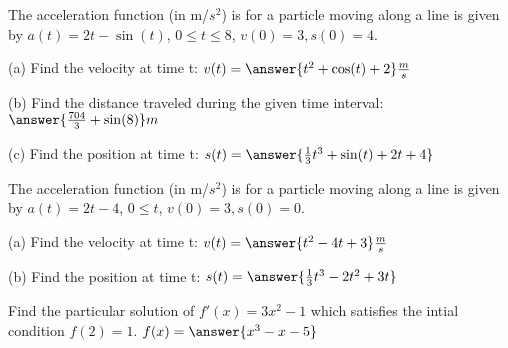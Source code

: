 \documentclass{ximera}
\begin{document}
\begin{exercise}
The acceleration function (in m/$s^2$) is for a particle moving along a line is given by $a(t)=2t-\sin(t)$, $0\leq t\leq 8$, $v(0)=3, s(0)=4$.

(a) Find the velocity at time t: $v(t)=\answer{t^2+\cos(t)+2} \frac{m}{s}$

(b) Find the distance traveled during the given time interval: $\answer{\frac{704}{3}+\sin(8)} m$

(c) Find the position at time t: $s(t)=\answer{\frac{1}{3}t^3+\sin(t)+2t+4}$
\end{exercise}

\begin{exercise}
The acceleration function (in m/$s^2$) is for a particle moving along a line is given by $a(t)=2t-4$, $0\leq t$, $v(0)=3, s(0)=0$.

(a) Find the velocity at time t: $v(t)=\answer{t^2-4t+3} \frac{m}{s}$

(b) Find the position at time t: $s(t)=\answer{\frac{1}{3}t^3-2t^2+3t}$
\end{exercise}

\begin{exercise}
Find the particular solution of $f'(x)=3x^2-1$ which satisfies the intial condition $f(2)=1$. $f(x)=\answer{x^3-x-5}$
\end{exercise}
\end{document}
